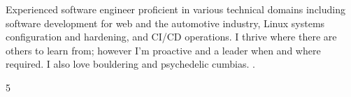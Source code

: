 \documentclass[9pt]{developercv} %
\begin{document}


\begin{minipage}[t]{0.5\textwidth} %
	\vspace{-\baselineskip} %
	
  \vspace{0.1cm} %
  Experienced software engineer proficient in various technical domains including software development for web and
  the automotive industry, Linux systems configuration and hardening, and CI/CD operations. I thrive where there are
  others to learn from; however I'm proactive and a leader when and where required. I also love bouldering and
  psychedelic cumbias. .\\
\end{minipage}
\hfill %
\begin{minipage}[t]{0.4\textwidth} %
	\vspace{-\baselineskip} %
	
  \vspace{0.6cm} %
	\begin{barchart}{5} %
	\end{barchart}
\end{minipage}


\end{document}
